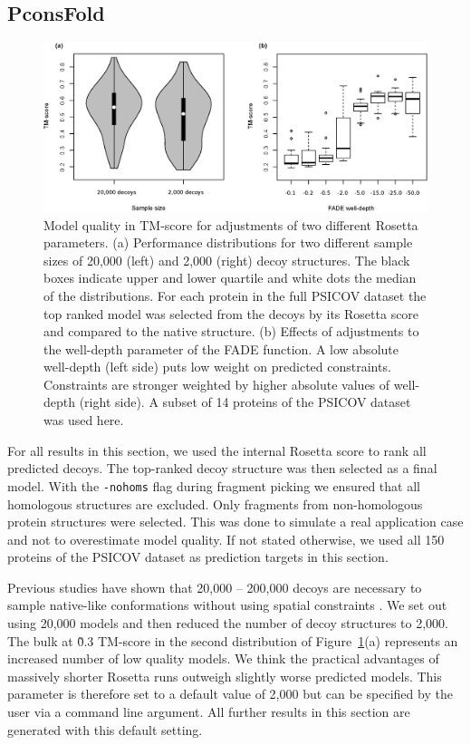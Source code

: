 \documentclass{bioinfo}
\begin{document}
\subsection{PconsFold}
\begin{figure}[!tpb]%
\centerline{\includegraphics[scale=0.7]{figures/rosetta.eps}}
\caption{Model quality in TM-score for adjustments of two
 different Rosetta parameters. (a) Performance distributions 
 for two different sample sizes of 20,000 (left) and 2,000 (right) 
 decoy structures. The black boxes indicate upper and lower 
 quartile and white dots the median of the distributions. For each 
 protein in the full PSICOV dataset the top 
 ranked model was selected from the decoys by its Rosetta score and 
 compared to the native structure. (b) Effects of adjustments to 
 the well-depth parameter of the FADE function. A low absolute 
 well-depth (left side) puts low weight on predicted constraints. 
 Constraints are stronger weighted by higher absolute values of 
 well-depth (right side). A subset of 14 proteins of the PSICOV dataset was used here.}\label{fig:ros} 
\end{figure}
For all results in this section, we used the internal Rosetta score to
rank all predicted decoys. The top-ranked decoy structure was then
selected as a final model. With the {\tt -nohoms} flag during fragment
picking we ensured that all homologous structures are excluded. Only
fragments from non-homologous protein structures were selected. This
was done to simulate a real application case and not to overestimate
model quality. If not stated otherwise, we used all 150 proteins of
the PSICOV dataset as prediction targets in this section. 

Previous studies have shown that 20,000 -- 200,000 decoys are
necessary to sample native-like conformations without using spatial
constraints \cite[]{Simons10526365}. We set out using 20,000 models
and then reduced the number of decoy structures to
2,000. The bulk at \~0.3 TM-score in the second
distribution of Figure~\ref{fig:ros}(a) represents an increased
number of low quality models. We think the practical advantages of
massively shorter Rosetta runs outweigh slightly worse predicted
models. This parameter is therefore set to a default value of 2,000
but can be specified by the user via a command line argument. All
further results in this section are generated with this default
setting. 
\end{document}
